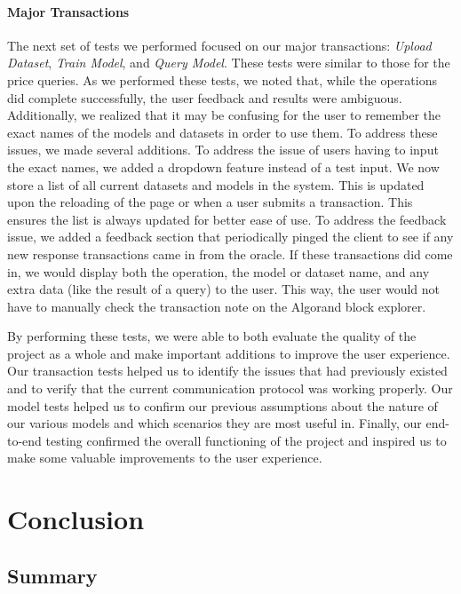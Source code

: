 \documentclass{ledger}
\begin{document}
\paragraph{Major Transactions}
The next set of tests we performed focused on our major transactions: \textit{Upload Dataset}, \textit{Train Model},
and \textit{Query Model}.  These tests were similar to those for the price queries.  As we performed these tests, we
noted that, while the operations did complete successfully, the user feedback and results were ambiguous.  Additionally,
we realized that it may be confusing for the user to remember the exact names of the models and datasets in order to
use them.  To address these issues, we made several additions.  To address the issue of users having to input the
exact names, we added a dropdown feature instead of a test input.  We now store a list of all current datasets and
models in the system.  This is updated upon the reloading of the page or when a user submits a transaction.  This
ensures the list is always updated for better ease of use.  To address the feedback issue, we added a feedback section
that periodically pinged the client to see if any new response transactions came in from the oracle.  If these
transactions did come in, we would display both the operation, the model or dataset name, and any extra data (like
the result of a query) to the user.  This way, the user would not have to manually check the transaction note on
the Algorand block explorer.

By performing these tests, we were able to both evaluate the quality of the project as a whole and make important
additions to improve the user experience.  Our transaction tests helped us to identify the issues that had
previously existed and to verify that the current communication protocol was working properly.  Our model tests
helped us to confirm our previous assumptions about the nature of our various models and which scenarios they are
most useful in.  Finally, our end-to-end testing confirmed the overall functioning of the project and inspired us
to make some valuable improvements to the user experience.

\section{Conclusion}

\subsection{Summary}
\end{document}
